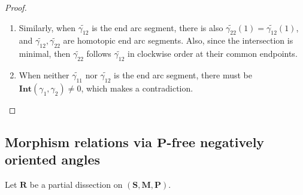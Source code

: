 \documentclass[a4paper,10pt]{amsart}
\theoremstyle{plain}          %
\theoremstyle{definition}
\def\SS{\mathbf{S}}
\def\af{\mathbf{a}}
\def\MM{\mathbf{M}}
\def\PP{\mathbf{P}}
\def\MM{\mathbf{M}}
\newcommand{\Int}{\mathbf{Int}}
\newcommand{\apfree}{\angle^-_{\mathbf{P-free}}}
\begin{document}
\begin{proof}
\begin{enumerate}
    If $\widetilde{\gamma_{21}}$ is not the end arc segment, then $\widetilde{\gamma_{21}}$ will cross the arc $\af_{i-1}$, where $\af_{i-1}$ follows $\af_i$ in clockwise order around $p$. Since the intersection that $\gamma_1$ intersects with $\af_i$ closest to $p$, and $\widetilde{\gamma_2}$ crosses the arc $\af_i$, then there must be an intersection between $\widetilde{\gamma_{21}}$ and $\widetilde{\gamma_{11}}$, which contradicts $\Int(\gamma_1,\gamma_2)=0$. Therefore $\widetilde{\gamma_{21}}$ is the end arc segment and  $\widetilde{\gamma_{21}}(1)=\widetilde{\gamma_2}(0)$ lies in $\af_i$. Since $\gamma_2$ is permissible, then $\widetilde{\gamma_{21}}(0)$ is also one of the endpoints of $\af_s$, in fact $\widetilde{\gamma_{21}}(0)=\widetilde{\gamma_{11}}(0)$. 
    
    Then we conclude that $\widetilde{\gamma_{11}},\widetilde{\gamma_{21}}$ are end arc segments of $\gamma_1,\gamma_2$ respectively, and they are homotopic.  Note that $\Int(\gamma_1,\gamma_2)=0$, then  $\widetilde{\gamma_{21}}$ follows $\widetilde{\gamma_{11}}$ in clockwise order in their common endpoint.
    
    \item Similarly, when $\widetilde{\gamma_{12}}$ is the end arc segment, there is also $\widetilde{\gamma_{22}}(1)=\widetilde{\gamma_{12}}(1)$, and $\widetilde{\gamma_{12}}, \widetilde{\gamma_{22}}$ are homotopic end arc segments. Also, since the intersection is minimal, then $ \widetilde{\gamma_{22}}$ follows $\widetilde{\gamma_{12}}$ in clockwise order at their common endpoints.
    \item When neither $\widetilde{\gamma_{11}}$ nor $\widetilde{\gamma_{12}}$ is the end arc segment, there must be $\Int(\gamma_1,\gamma_2)\ne0$, which makes a contradiction. 
\end{enumerate}
\end{proof}
\fi


\subsection{Morphism relations via 
$\PP$-free negatively oriented angles}

Let $\mathbf{R}$  be a partial dissection on $(\SS,\MM,\PP)$.
\end{document}
